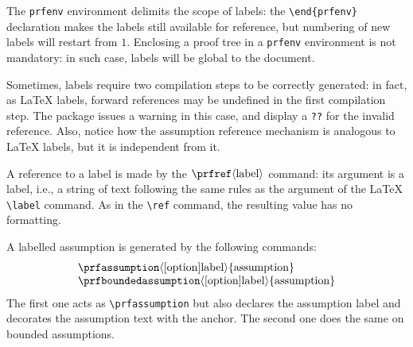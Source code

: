 \documentclass{amsart}
\begin{document}
The \verb|prfenv| environment delimits the scope of labels: the
\verb|\end{prfenv}| declaration makes the labels still available
for reference, but numbering of new labels will restart from
$1$. Enclosing a proof tree in a \verb|prfenv| environment is not
mandatory: in such case, labels will be global to the
document.\vspace{2ex}

Sometimes, labels require two compilation steps to be correctly
generated: in fact, as \LaTeX{} labels, forward references may be
undefined in the first compilation step. The package issues a warning
in this case, and display a \verb|??| for the invalid reference. Also,
notice how the assumption reference mechanism is analogous to \LaTeX{}
labels, but it is independent from it.\vspace{2ex}

A reference to a label is made by the
$\verb|\prfref|\langle\mathrm{label}\rangle$ command: its argument is
a label, i.e., a string of text following the same rules as the
argument of the \LaTeX{} \verb|\label| command. As in the \verb|\ref|
command, the resulting value has no formatting.\vspace{2ex}

A labelled assumption is generated by the following commands:
\begin{displaymath}
  \begin{array}{l}
    \verb|\prfassumption|\langle[\mathrm{option}]\mathrm{label}\rangle
    \{\mathrm{assumption}\}
    \\ 
    \verb|\prfboundedassumption|\langle[\mathrm{option}]
    \mathrm{label}\rangle\{\mathrm{assumption}\} 
  \end{array}
\end{displaymath}
The first one acts as \verb|\prfassumption| but also declares the
assumption label and decorates the assumption text with the
anchor. The second one does the same on bounded assumptions. 
\end{document}
